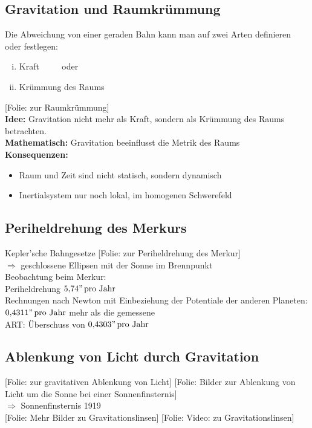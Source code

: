 \documentclass[titlepage,11pt,a4paper,ngerman]{report}
\newcommand{\tx}[1]{\textrm{#1}}
\newcommand{\folie}[1]{\color{gray}[Folie: #1]\color{black}}
\begin{document}
\subsection{Gravitation und Raumkrümmung}
Die Abweichung von einer geraden Bahn kann man auf zwei Arten definieren oder festlegen:
\begin{enumerate}[(i)]
	\item Kraft $ \qquad $ oder
	\item Krümmung des Raums
\end{enumerate}
\folie{zur Raumkrümmung}\\
\textbf{Idee:} Gravitation nicht mehr als Kraft, sondern als Krümmung des Raums betrachten.\\
\textbf{Mathematisch:} Gravitation beeinflusst die Metrik des Raums\\[5pt]
\textbf{Konsequenzen:}
\begin{itemize}
	\item Raum und Zeit sind nicht statisch, sondern dynamisch
	\item Inertialsystem nur noch lokal, im homogenen Schwerefeld
\end{itemize}

\subsection{Periheldrehung des Merkurs}
Kepler'sche Bahngesetze \folie{zur Periheldrehung des Merkur}\\
$ \Rightarrow $ geschlossene Ellipsen mit der Sonne im Brennpunkt\\[5pt]
Beobachtung beim Merkur:\\
Periheldrehung $ 5{,}74" \, \tx{pro Jahr} $\\[5pt]
Rechnungen nach Newton mit Einbeziehung der Potentiale der anderen Planeten: $ 0{,}4311" \, \tx{pro Jahr} $ mehr als die gemessene\\[5pt]
ART: Überschuss von $ 0{,}4303" \, \tx{pro Jahr} $

\subsection{Ablenkung von Licht durch Gravitation}
\folie{zur gravitativen Ablenkung von Licht} \folie{Bilder zur Ablenkung von Licht um die Sonne bei einer Sonnenfinsternis}\\
$ \Rightarrow $ Sonnenfinsternis 1919\\
\folie{Mehr Bilder zu Gravitationslinsen} \folie{Video: zu Gravitationslinsen}
\end{document}
